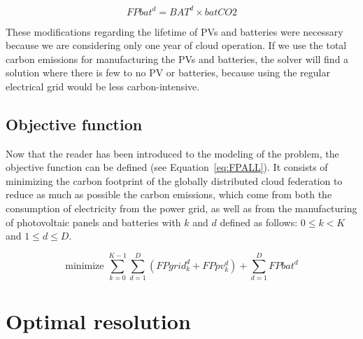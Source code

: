 \begin{equation} \label{eq:fbat}
   FPbat^d =  BAT^d \times batCO2
\end{equation}


These modifications regarding the lifetime of PVs and batteries were necessary because we are considering only one year of cloud operation. If we use the total carbon emissions for manufacturing the PVs and batteries, the solver will find a solution where there is few to no PV or batteries, because using the regular electrical grid would be less carbon-intensive.  

\subsection{Objective function}
\label{sec:objectivefunction_ccgrid}

Now that the reader has been introduced to the modeling of the problem, the objective function can be defined (see Equation~\eqref{eq:FPALL}). It consists of minimizing the carbon footprint of the globally distributed cloud federation to reduce as much as possible the carbon emissions, which come from both the consumption of electricity from the power grid, as well as from the manufacturing of photovoltaic panels and batteries with $k$ and $d$ defined as follows: $0\leq k< K$ and $1\leq d\leq D$.

\begin{equation} \label{eq:FPALL}
\text{minimize }\sum_{k=0}^{K-1} \sum_{d=1}^D ( FPgrid^d_k +  FPpv^d_k) + \sum_{d=1}^D FPbat^d
\end{equation}


\section{Optimal resolution}
\label{sec:optimalresolution_ccgrid}


